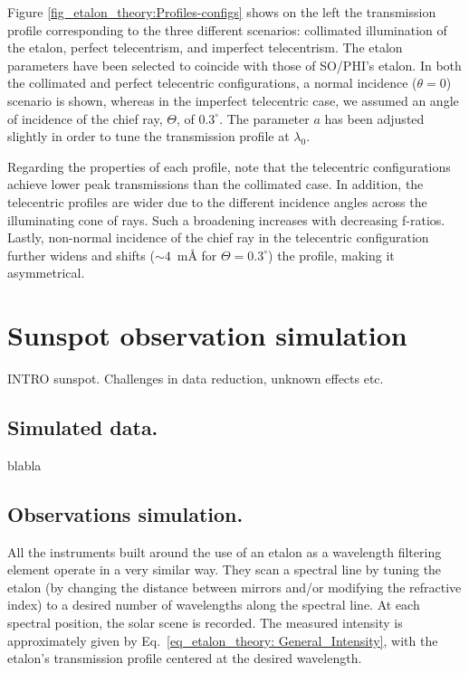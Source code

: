Figure \ref{fig_etalon_theory:Profiles-configs} shows on the left the transmission profile corresponding to the three different scenarios: collimated illumination of the etalon, perfect telecentrism, and imperfect telecentrism. The etalon parameters have been selected to coincide with those of SO/PHI's etalon. In both the collimated and perfect telecentric configurations, a normal incidence  ($\theta = 0$) scenario is shown, whereas in the imperfect telecentric case, we assumed an angle of incidence of the chief ray, $\Theta$, of $0.3^{\circ}$. The parameter $a$ has been adjusted slightly in order to tune the transmission profile at $\lambda _ 0$. 

Regarding the properties of each profile, note that the telecentric configurations achieve lower peak transmissions than the collimated case. In addition, the telecentric profiles are wider due to the different incidence angles across the illuminating cone of rays. Such a broadening increases with decreasing f-ratios. Lastly, non-normal incidence of the chief ray in the telecentric configuration further widens and shifts ($\sim 4$~m\r{A}
for $\Theta=0.3^\circ$) the profile, making it asymmetrical. 

\section{Sunspot observation simulation}
INTRO sunspot. Challenges in data reduction, unknown effects etc. 

\subsection{Simulated data.}

blabla
\subsection{Observations simulation.}

All the instruments built around the use of an etalon as a wavelength filtering element operate in a very similar way. They scan a spectral line by tuning the etalon (by changing the distance between mirrors and/or modifying the refractive index) to a desired number of wavelengths along the spectral line. At each spectral position, the solar scene is recorded. The measured intensity is approximately given by Eq.~\eqref{eq_etalon_theory: General_Intensity}, with the etalon's transmission profile centered at the desired wavelength.


